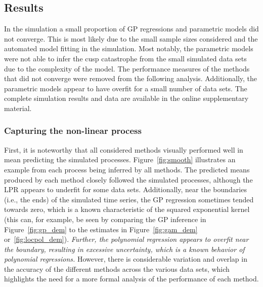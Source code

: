 \documentclass[man, floatsintext]{apa7}
\begin{document}
\subsection{Results}

In the simulation a small proportion of GP regressions and parametric models
did not converge. This is most likely due to the small sample sizes considered
and the automated model fitting in the simulation. Most notably, the parametric
models were not able to infer the cusp catastrophe from the small simulated
data sets due to the complexity of the model. The performance measures of the
methods that did not converge were removed from the following analysis.
Additionally, the parametric models appear to have overfit for a small number
of data sets. The complete simulation results and data are available in the
online supplementary material.

\subsubsection{Capturing the non-linear process}

First, it is noteworthy that all considered methods visually performed well in
mean predicting the simulated processes. Figure~\ref{fig:smooth} illustrates an
example from each process being inferred by all methods. The predicted means
produced by each method closely followed the simulated processes, although the
LPR appears to underfit for some data sets. Additionally, near the boundaries
(i.e., the ends) of the simulated time series, the GP regression sometimes
tended towards zero, which is a known characteristic of the squared exponential
kernel (this can, for example, be seen by comparing the GP inference in
Figure~\ref{fig:gp_dem} to the estimates in Figure~\ref{fig:gam_dem}
or~\ref{fig:locpol_dem}). \textit{Further, the polynomial regression appears to
  overfit near the boundary, resulting in excessive uncertainty, which is a
  known
  behavior of polynomial regressions.} However, there is considerable variation
and overlap in the accuracy of the different methods across the various data
sets, which highlights the need for a more formal analysis of the
performance of each method.

\begin{sidewaysfigure*}[htbp]
  \caption{Example processes inferred by each of the introduced methods}
  \label{fig:smooth}
\end{sidewaysfigure*}
\end{document}
